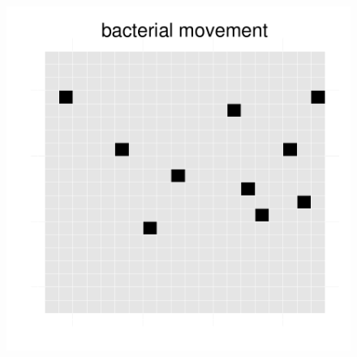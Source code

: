 \begin{figure}[h!]
{\begin{minipage}[t]{0.3\textwidth}
  \end{minipage}
  \begin{minipage}[t]{0.3\textwidth}
    \includegraphics[width=\textwidth]{../results/barkeri_20x20_seed9659_bac130.pdf}
  \end{minipage}
  }
\end{figure}
